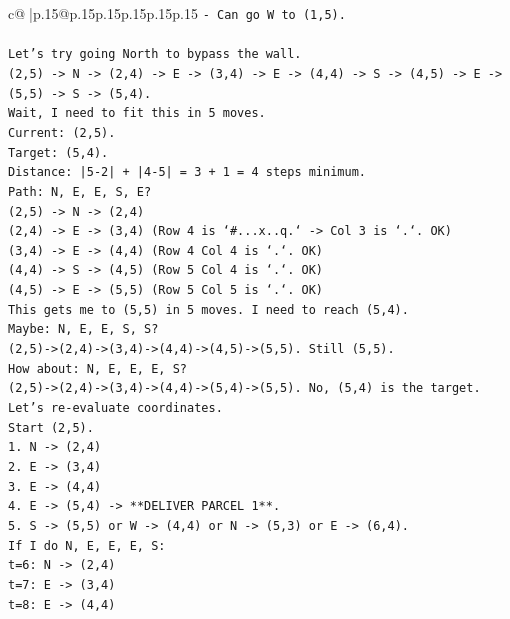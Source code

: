 \documentclass{article}
\begin{document}
{\begin{supertabular}{c@{$\;$}|p{.15\linewidth}@{}p{.15\linewidth}p{.15\linewidth}p{.15\linewidth}p{.15\linewidth}p{.15\linewidth}}
{{{\texttt{{-} Can go W to (1,5).} \\
\\ 
\texttt{Let's try going North to bypass the wall.} \\
\texttt{(2,5) {-}> N {-}> (2,4) {-}> E {-}> (3,4) {-}> E {-}> (4,4) {-}> S {-}> (4,5) {-}> E {-}> (5,5) {-}> S {-}> (5,4).} \\
\texttt{Wait, I need to fit this in 5 moves.} \\
\texttt{Current: (2,5).} \\
\texttt{Target: (5,4).} \\
\texttt{Distance: |5{-}2| + |4{-}5| = 3 + 1 = 4 steps minimum.} \\
\texttt{Path: N, E, E, S, E?} \\
\texttt{(2,5) {-}> N {-}> (2,4)} \\
\texttt{(2,4) {-}> E {-}> (3,4) (Row 4 is `\#...x..q.` {-}> Col 3 is `.`. OK)} \\
\texttt{(3,4) {-}> E {-}> (4,4) (Row 4 Col 4 is `.`. OK)} \\
\texttt{(4,4) {-}> S {-}> (4,5) (Row 5 Col 4 is `.`. OK)} \\
\texttt{(4,5) {-}> E {-}> (5,5) (Row 5 Col 5 is `.`. OK)} \\
\texttt{This gets me to (5,5) in 5 moves. I need to reach (5,4).} \\
\texttt{Maybe: N, E, E, S, S?} \\
\texttt{(2,5){-}>(2,4){-}>(3,4){-}>(4,4){-}>(4,5){-}>(5,5). Still (5,5).} \\
\texttt{How about: N, E, E, E, S?} \\
\texttt{(2,5){-}>(2,4){-}>(3,4){-}>(4,4){-}>(5,4){-}>(5,5). No, (5,4) is the target.} \\
\texttt{Let's re{-}evaluate coordinates.} \\
\texttt{Start (2,5).} \\
\texttt{1. N {-}> (2,4)} \\
\texttt{2. E {-}> (3,4)} \\
\texttt{3. E {-}> (4,4)} \\
\texttt{4. E {-}> (5,4) {-}> **DELIVER PARCEL 1**.} \\
\texttt{5. S {-}> (5,5) or W {-}> (4,4) or N {-}> (5,3) or E {-}> (6,4).} \\
\texttt{If I do N, E, E, E, S:} \\
\texttt{t=6: N {-}> (2,4)} \\
\texttt{t=7: E {-}> (3,4)} \\
\texttt{t=8: E {-}> (4,4)} \\
}}}
\end{supertabular}}
\end{document}
